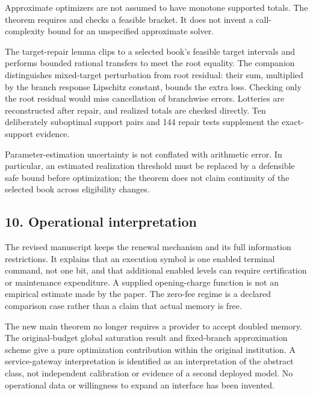 \documentclass[11pt,letterpaper]{article}
\begin{document}
Approximate optimizers are not assumed to have monotone supported totals. The theorem requires and checks a feasible bracket. It does not invent a call-complexity bound for an unspecified approximate solver.



The target-repair lemma clips to a selected book's feasible target intervals and performs bounded rational transfers to meet the root equality. The companion distinguishes mixed-target perturbation from root residual: their sum, multiplied by the branch response Lipschitz constant, bounds the extra loss. Checking only the root residual would miss cancellation of branchwise errors. Lotteries are reconstructed after repair, and realized totals are checked directly. Ten deliberately suboptimal support pairs and 144 repair tests supplement the exact-support evidence.



Parameter-estimation uncertainty is not conflated with arithmetic error. In particular, an estimated realization threshold must be replaced by a defensible safe bound before optimization; the theorem does not claim continuity of the selected book across eligibility changes.



\subsection*{10. Operational interpretation}


The revised manuscript keeps the renewal mechanism and its full information restrictions. It explains that an execution symbol is one enabled terminal command, not one bit, and that additional enabled levels can require certification or maintenance expenditure. A supplied opening-charge function is not an empirical estimate made by the paper. The zero-fee regime is a declared comparison case rather than a claim that actual memory is free.



The new main theorem no longer requires a provider to accept doubled memory. The original-budget global saturation result and fixed-branch approximation scheme give a pure optimization contribution within the original institution. A service-gateway interpretation is identified as an interpretation of the abstract class, not independent calibration or evidence of a second deployed model. No operational data or willingness to expand an interface has been invented.
\end{document}
